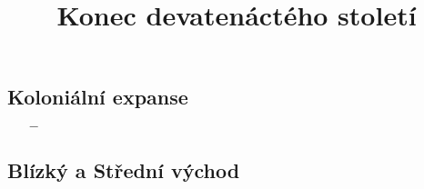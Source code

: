 \documentclass{article}
\title{\vspace{-2cm}Konec devatenáctého století\vspace{-1.7cm}}
\date{}
\author{}
\begin{document}
\maketitle

\subsection*{Koloniální expanse}
\begin{itemize}
    \vspace{-0.5em}
    \setlength\itemsep{0.15em}
    \item[$-$]
\end{itemize}


\subsection*{Blízký a Střední východ}
\end{document}
